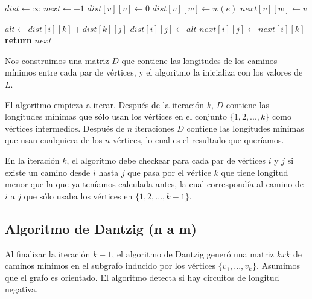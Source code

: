 \begin{algorithm}
\begin{algorithmic}[1]
  \State $dist \gets \infty$
  \State $next \gets -1$
    \State $dist[v][v] \gets 0$
  \EndFor
    \State $dist[v][w] \gets w(e)$
    \State $next[v][w] \gets v$
  \EndFor

        \State $alt \gets dist[i][k] + dist[k][j]$
          \State $dist[i][j] \gets alt$
          \State $next[i][j] \gets next[i][k]$
        \EndIf
      \EndFor
    \EndFor
  \EndFor
  \State \textbf{return} $next$
\EndFunction
\end{algorithmic}
\end{algorithm}

Nos construimos una matriz $D$ que contiene las longitudes de los caminos m\'inimos entre cada par de v\'ertices, y el algoritmo la inicializa con los valores de $L$.

El algoritmo empieza a iterar. Despu\'es de la iteraci\'on $k$, $D$ contiene las longitudes m\'inimas que s\'olo usan los v\'ertices en el conjunto $\{1, 2, ..., k\}$ como v\'ertices intermedios. Despu\'es de $n$ iteraciones $D$ contiene las longitudes m\'inimas que usan cualquiera de los $n$ v\'ertices, lo cual es el resultado que quer\'iamos.

En la iteraci\'on $k$, el algoritmo debe checkear para cada par de v\'ertices $i$ y $j$ si existe un camino desde $i$ hasta $j$ que pasa por el v\'ertice $k$ que tiene longitud menor que la que ya ten\'iamos calculada antes, la cual correspond\'ia al camino de $i$ a $j$ que s\'olo usaba los v\'ertices en $\{1, 2, ..., k-1\}$.



\newpage
\subsection{Algoritmo de Dantzig (n a m)}

Al finalizar la iteraci\'on $k-1$, el algoritmo de Dantzig gener\'o una matriz $k x k$ de caminos m\'inimos en el subgrafo inducido por los v\'ertices $\{v_1, ..., v_k\}$. Asumimos que el grafo es orientado. El algoritmo detecta si hay circuitos de longitud negativa.

